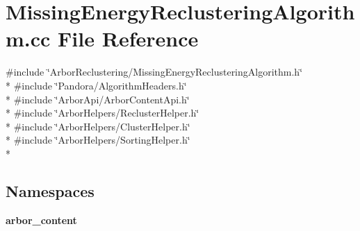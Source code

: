 \section{Missing\+Energy\+Reclustering\+Algorithm.\+cc File Reference}
\label{MissingEnergyReclusteringAlgorithm_8cc}
{\ttfamily \#include \char`\"{}Arbor\+Reclustering/\+Missing\+Energy\+Reclustering\+Algorithm.\+h\char`\"{}}\\*
{\ttfamily \#include \char`\"{}Pandora/\+Algorithm\+Headers.\+h\char`\"{}}\\*
{\ttfamily \#include \char`\"{}Arbor\+Api/\+Arbor\+Content\+Api.\+h\char`\"{}}\\*
{\ttfamily \#include \char`\"{}Arbor\+Helpers/\+Recluster\+Helper.\+h\char`\"{}}\\*
{\ttfamily \#include \char`\"{}Arbor\+Helpers/\+Cluster\+Helper.\+h\char`\"{}}\\*
{\ttfamily \#include \char`\"{}Arbor\+Helpers/\+Sorting\+Helper.\+h\char`\"{}}\\*
\subsection*{Namespaces}
\begin{DoxyCompactItemize}
\item 
 {\bf arbor\+\_\+content}
\end{DoxyCompactItemize}
